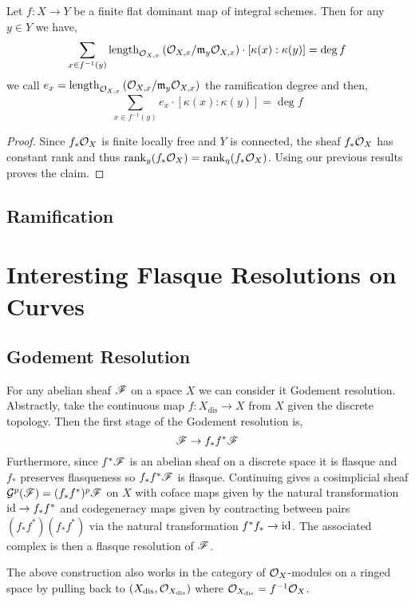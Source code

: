 \documentclass[12pt]{article}
\begin{document}
\begin{prop}
Let $f : X \to Y$ be a finite flat dominant map of integral schemes. Then for any $y \in Y$ we have,
\[ \sum_{x \in f^{-1}(y)} \mathrm{length}_{\mathcal{O}_{X, x}}\left( \mathcal{O}_{X, x} / \mathfrak{m}_y \mathcal{O}_{X, x} \right) \cdot [\kappa(x) : \kappa(y)] = \deg{f} \]
we call $e_x = \mathrm{length}_{\mathcal{O}_{X, x}}\left( \mathcal{O}_{X, x} / \mathfrak{m}_y \mathcal{O}_{X, x} \right)$ the ramification degree and then,
\[ \sum_{x \in f^{-1}(y)} e_x \cdot [\kappa(x) : \kappa(y)] = \deg{f} \]
\end{prop}

\begin{proof}
Since $f_* \mathcal{O}_{X}$ is finite locally free and $Y$ is connected, the sheaf $f_* \mathcal{O}_{X}$ has constant rank and thus $\operatorname{\mathrm{rank}}_y(f_*\mathcal{O}_{X}) = \operatorname{\mathrm{rank}}_\eta(f_* \mathcal{O}_{X})$. Using our previous results proves the claim.
\end{proof}

\subsection{Ramification}


\section{Interesting Flasque Resolutions on Curves}

\subsection{Godement Resolution}

For any abelian sheaf $\mathscr{F}$ on a space $X$ we can consider it Godement resolution. Abstractly, take the continuous map $f : X_{\text{dis}} \to X$ from $X$ given the discrete topology. Then the first stage of the Godement resolution is,
\[ \mathscr{F} \to f_* f^* \mathscr{F} \]
Furthermore, since $f^* \mathscr{F}$ is an abelian sheaf on a discrete space it is flasque and $f_*$ preserves flasqueness so $f_* f^* \mathscr{F}$ is flasque.
Continuing gives a cosimplicial sheaf $\mathcal{G}^p(\mathscr{F}) = (f_* f^*)^p \mathscr{F}$ on $X$ with coface maps given by the natural transformation $\mathrm{id} \to f_* f^*$ and codegeneracy maps given by contracting between pairs $(f_* f^*)(f_* f^*)$ via the natural transformation $f^* f_* \to \mathrm{id}$.
The associated complex is then a flasque resolution of $\mathscr{F}$.

\begin{rmk}
The above construction also works in the category of $\mathcal{O}_{X}$-modules on a ringed space by pulling back to $(X_{\text{dis}}, \mathcal{O}_{X_{\text{dis}}})$ where $\mathcal{O}_{X_{\text{dis}}} = f^{-1} \mathcal{O}_{X}$.
\end{rmk}
\end{document}
